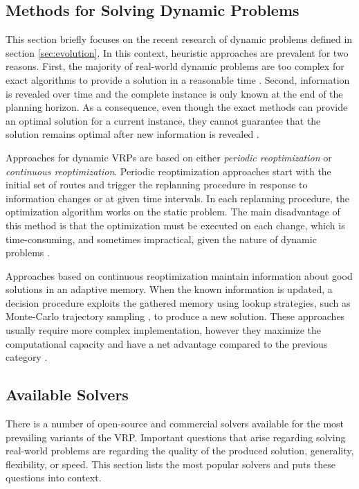 \subsection{Methods for Solving Dynamic Problems} \label{sec:dynamic}

This section briefly focuses on the recent research of dynamic problems defined in section \ref{sec:evolution}. In this context, heuristic approaches are prevalent for two reasons. First, the majority of real-world dynamic problems are too complex for exact algorithms to provide a solution in a reasonable time \cite{Bono2020}. Second, information is revealed over time and the complete instance is only known at the end of the planning horizon. As a consequence, even though the exact methods can provide an optimal solution for a current instance, they cannot guarantee that the solution remains optimal after new information is revealed \cite{PILLAC20131}.

Approaches for dynamic VRPs are based on either \emph{periodic reoptimization} or \emph{continuous reoptimization}. Periodic reoptimization approaches start with the initial set of routes and trigger the replanning procedure in response to information changes or at given time intervals. In each replanning procedure, the optimization algorithm works on the static problem. The main disadvantage of this method is that the optimization must be executed on each change, which is time-consuming, and sometimes impractical, given the nature of dynamic problems \cite{PILLAC20131, darp-survey}.

Approaches based on continuous reoptimization maintain information about good solutions in an adaptive memory. When the known information is updated, a decision procedure exploits the gathered memory using lookup strategies, such as Monte-Carlo trajectory sampling \cite{Bono2020}, to produce a new solution. These approaches usually require more complex implementation, however they maximize the computational capacity and have a net advantage compared to the previous category \cite{PILLAC20131, Bono2020}. 

\subsection{Available Solvers} \label{solvers}

There is a number of open-source and commercial solvers available for the most prevailing variants of the VRP.  Important questions that arise regarding solving real-world problems are regarding the quality of the produced solution, generality, flexibility, or speed. This section lists the most popular solvers and puts these questions into context.


